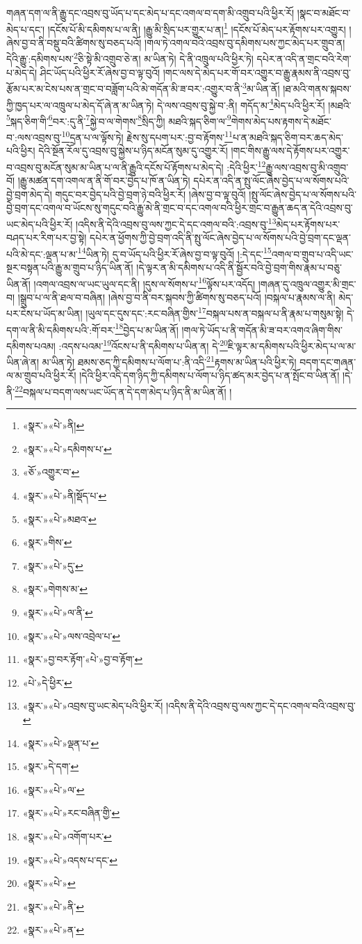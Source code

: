 གཞན་དག་ལ་ནི་རྒྱུ་དང་འབྲས་བུ་ཡོད་པ་དང་མེད་པ་དང་འགལ་བ་དག་མི་འགྲུབ་པའི་ཕྱིར་རོ། །སྣང་བ་མཐོང་བ་མེད་པ་དང་། །དངོས་པོ་མི་དམིགས་པ་ལ་ནི། །རྒྱུ་མི་སྲིད་པར་གྱུར་པ་ན།\footnote{«སྣར་»«པེ་»ནི།} །དངོས་པོ་མེད་པར་རྟོགས་པར་འགྱུར། །ཞེས་བྱ་བ་ནི་བསྡུ་བའི་ཚིགས་སུ་བཅད་པའོ། །གལ་ཏེ་འགལ་བའི་འབྲས་བུ་དམིགས་པས་ཀྱང་མེད་པར་གྲུབ་ན། དེའི་རྒྱུ་:དམིགས་པས་\footnote{«སྣར་»«པེ་»དམིགས་པ་}ཅི་སྟེ་མི་འགྲུབ་ཅེ་ན། མ་ཡིན་ཏེ། དེ་ནི་འཁྲུལ་པའི་ཕྱིར་ཏེ། དཔེར་ན་འདི་ན་གྲང་བའི་རེག་པ་མེད་དེ། ཤིང་ཡོད་པའི་ཕྱིར་རོ་ཞེས་བྱ་བ་ལྟ་བུའོ། །གང་ལས་དེ་མེད་པར་གོ་བར་འགྱུར་བ་རྒྱུ་རྣམས་ནི་འབྲས་བུ་རྩོམ་པར་མ་ངེས་པས་ན་གྲང་བ་བཟློག་པའི་མེ་གདོན་མི་ཟ་བར་:འགྱུར་བ་ནི་\footnote{«ཅོ་»འགྱུར་བ་}མ་ཡིན་ནོ། །ཐ་མའི་གནས་སྐབས་ཀྱི་ཁྱད་པར་ལ་འཁྲུལ་པ་མེད་དོ་ཞེ་ན་མ་ཡིན་ཏེ། དེ་ལས་འབྲས་བུ་སྐྱེ་བ་:ནི། གདོད་མ་\footnote{«སྣར་»«པེ་»ནི།སྡོད་པ་}མེད་པའི་ཕྱིར་རོ། །མཐའི་\footnote{«སྣར་»«པེ་»མཐའ་}སྐད་ཅིག་གི་\footnote{«སྣར་»གིས་}བར་:དུ་ནི་\footnote{«སྣར་»«པེ་»དུ་}སྐྱེ་བ་ལ་གེགས་\footnote{«སྣར་»གེགས་མ་}སྲིད་ཀྱི། མཐའི་སྐད་ཅིག་ལ་\footnote{«སྣར་»«པེ་»ལ་ནི་}གེགས་མེད་པས་རྟགས་དེ་མཐོང་བ་:ལས་འབྲས་བུ་\footnote{«སྣར་»«པེ་»ལས་འབྲེལ་པ་}དྲན་པ་ལ་ལྟོས་ཏེ། རྗེས་སུ་དཔག་པར་:བྱ་བ་རྟོགས་\footnote{«སྣར་»བྱ་བར་རྟོག་«པེ་»བྱ་བ་རྟོག་}པ་ན་མཐའི་སྐད་ཅིག་བར་ཆད་མེད་པའི་ཕྱིར། དེའི་སྔོན་རོལ་དུ་འབྲས་བུ་སྐྱེས་པ་ཉིད་མངོན་སུམ་དུ་འགྱུར་རོ། །གང་གིས་རྒྱུ་ལས་དེ་རྟོགས་པར་འགྱུར་བ་འབྲས་བུ་མངོན་སུམ་མ་ཡིན་པ་ལ་ནི་རྒྱུའི་དངོས་པོ་རྟོགས་པ་མེད་དེ། :དེའི་ཕྱིར་\footnote{«པེ་»དེ་ཕྱིར་}རྒྱུ་ལས་འབྲས་བུ་མི་འགྲུབ་བོ། །རྒྱུ་མཚན་དག་འགལ་ན་ནི་གོ་བར་བྱེད་པ་ཁོ་ན་ཡིན་ཏེ། དཔེར་ན་འདི་ན་སྤུ་ལོང་ཞེས་བྱེད་པ་ལ་སོགས་པའི་བྱེ་བྲག་མེད་དེ། གདུང་བར་བྱེད་པའི་བྱེ་བྲག་ཉེ་བའི་ཕྱིར་རོ། །ཞེས་བྱ་བ་ལྟ་བུའོ། །སྤུ་ལོང་ཞེས་བྱེད་པ་ལ་སོགས་པའི་བྱེ་བྲག་དང་འགལ་བ་ཡོངས་སུ་གདུང་བའི་རྒྱུ་མེ་ནི་གྲང་བ་དང་འགལ་བའི་ཕྱིར་གྲང་བ་རྒྱུན་ཆད་ན་དེའི་འབྲས་བུ་ཡང་མེད་པའི་ཕྱིར་རོ། །འདིས་ནི་དེའི་འབྲས་བུ་ལས་ཀྱང་དེ་དང་འགལ་བའི་:འབྲས་བུ་\footnote{«སྣར་»«པེ་»འབྲས་བུ་ཡང་མེད་པའི་ཕྱིར་རོ། །འདིས་ནི་དེའི་འབྲས་བུ་ལས་ཀྱང་དེ་དང་འགལ་བའི་འབྲས་བུ་}མེད་པར་རྟོགས་པར་བཤད་པར་རིག་པར་བྱ་སྟེ། དཔེར་ན་ཕྱོགས་ཀྱི་བྱེ་བྲག་འདི་ནི་སྤུ་ལོང་ཞེས་བྱེད་པ་ལ་སོགས་པའི་བྱེ་བྲག་དང་ལྡན་པའི་མེ་དང་:ལྡན་པ་མ་\footnote{«སྣར་»«པེ་»ལྡན་པ་}ཡིན་ཏེ། དུ་བ་ཡོད་པའི་ཕྱིར་རོ་ཞེས་བྱ་བ་ལྟ་བུའོ། །:དེ་དང་\footnote{«སྣར་»དེ་དག་}འགལ་བ་གྲུབ་པ་འདི་ཡང་སྔར་བསྟན་པའི་རྒྱུ་མ་གྲུབ་པ་ཉིད་ཡིན་ནོ། །དེ་ལྟར་ན་མི་དམིགས་པ་འདི་ནི་སྦྱོར་བའི་བྱེ་བྲག་གིས་རྣམ་པ་བཅུ་ཡིན་ནོ། །འགལ་འབྲས་ལ་ཡང་ཡུལ་དང་ནི། །དུས་ལ་སོགས་པ་\footnote{«སྣར་»«པེ་»ལ་}ལྟོས་པར་འདོད། །གཞན་དུ་འཁྲུལ་འགྱུར་མི་གྲང་བ། །སྒྲུབ་པ་ལ་ནི་ཐལ་བ་བཞིན། །ཞེས་བྱ་བ་ནི་བར་སྐབས་ཀྱི་ཚིགས་སུ་བཅད་པའོ། །བསྐལ་པ་རྣམས་ལ་ནི། མེད་པར་ངེས་པ་ཡོད་མ་ཡིན། །ཡུལ་དང་དུས་དང་:རང་བཞིན་གྱིས་\footnote{«སྣར་»«པེ་»རང་བཞིན་གྱི་}བསྐལ་པས་ན་བསྐལ་པ་ནི་རྣམ་པ་གསུམ་སྟེ། དེ་དག་ལ་ནི་མི་དམིགས་པའི་:གོ་བར་\footnote{«སྣར་»«པེ་»འགོག་པར་}བྱེད་པ་མ་ཡིན་ནོ། །གལ་ཏེ་ཡོད་པ་ནི་གདོན་མི་ཟ་བར་འགའ་ཞིག་གིས་དམིགས་པའམ། :འདས་པའམ་\footnote{«སྣར་»«པེ་»འདས་པ་དང་}འོངས་པ་ནི་དམིགས་པ་ཡིན་ན། དེ་\footnote{«སྣར་»«པེ་»}ཇི་ལྟར་མ་དམིགས་པའི་ཕྱིར་མེད་པ་ལ་མ་ཡིན་ཞེ་ན། མ་ཡིན་ཏེ། ཐམས་ཅད་ཀྱི་དམིགས་པ་ལོག་པ་:ནི་འདི་\footnote{«སྣར་»«པེ་»ནི་}རྟགས་མ་ཡིན་པའི་ཕྱིར་ཏེ། བདག་དང་གཞན་ལ་མ་གྲུབ་པའི་ཕྱིར་རོ། །དེའི་ཕྱིར་འདི་དག་ཉིད་ཀྱི་དམིགས་པ་ལོག་པ་ཉིད་ཚད་མར་བྱེད་པ་ན་སྤོང་བ་ཡིན་ནོ། །དེ་ནི་\footnote{«སྣར་»«པེ་»ན་}བསྐལ་པ་བདག་ལས་ཡང་ཡོད་ན་དེ་དག་མེད་པ་ཉིད་ནི་མ་ཡིན་ནོ། །
